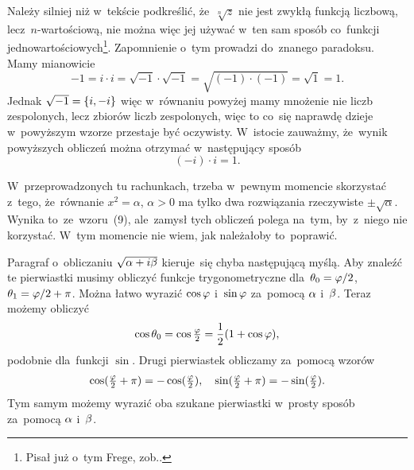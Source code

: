 \documentclass[a4paper,11pt]{article}
\begin{document}
\start {} Należy silniej niż w~tekście podkreślić,
że~$\sqrt[n]{ z }$ nie jest zwykłą funkcją liczbową,
lecz~$n$-wartościową, nie można więc jej używać w~ten sam sposób
co~funkcji jednowartościowych\footnote{Pisał już o~tym Frege,
  zob..}. Zapomnienie o~tym prowadzi do~znanego
paradoksu. Mamy mianowicie
\begin{equation}
  \label{eq:Leja-07}
  -1 = i \cdot i = \sqrt{ -1 } \cdot \sqrt{ -1 } 
  = \sqrt{ ( -1 ) \cdot ( -1 ) } = \sqrt{ 1 } = 1.
\end{equation}
Jednak $\sqrt{ -1 } = \{  i, -i  \}$ więc w~równaniu powyżej mamy
mnożenie nie liczb zespolonych, lecz zbiorów liczb zespolonych, więc
to co~się naprawdę dzieje w~powyższym wzorze przestaje być oczywisty.
W~istocie zauważmy, że~wynik powyższych obliczeń można otrzymać
w~następujący sposób
\begin{equation}
  \label{eq:Leja-08}
  ( -i ) \cdot i = 1.
\end{equation}

\vspace{\spaceFour}


\start {} W~przeprowadzonych tu rachunkach, trzeba w~pewnym
momencie skorzystać z~tego, że~równanie $x^{ 2 } = \alpha$,
$\alpha > 0$ ma tylko dwa rozwiązania rzeczywiste
$\pm \sqrt{ \alpha }$. Wynika to~ze~wzoru~(9), ale~zamysł tych
obliczeń polega na~tym, by~z~niego nie korzystać. W~tym momencie nie
wiem, jak należałoby to~poprawić.

\vspace{\spaceFour}


\start {} Paragraf o~obliczaniu $\sqrt{ \alpha + i \beta }$
kieruje~się chyba następującą myślą. Aby znaleźć te pierwiastki musimy
obliczyć funkcje trygonometryczne dla~$\theta_{ 0 } = \varphi / 2$,
$\theta_{ 1 } = \varphi / 2 + \pi$. Można łatwo wyrazić $\cos \varphi$
i~$\sin \varphi$ za~pomocą $\alpha$ i~$\beta$. Teraz możemy obliczyć
\begin{equation}
  \label{eq:Leja-09}
  \begin{split}
    \cos \theta_{ 0 } = \cos \tfrac{ \varphi }{ 2 } = \frac{ 1 }{ 2 } ( 1 + \cos
    \varphi ),
  \end{split}
\end{equation}
podobnie dla~funkcji $\sin$. Drugi pierwiastek obliczamy za~pomocą
wzorów
\begin{equation}
  \label{eq:Leja-10}
  \begin{split}
    \cos( \tfrac{ \varphi }{ 2 } + \pi ) = -\cos( \tfrac{ \varphi }{ 2 } ), \quad
    \sin( \tfrac{ \varphi }{ 2 } + \pi ) = -\sin( \tfrac{ \varphi }{ 2 } ).
  \end{split}
\end{equation}
Tym samym możemy wyrazić oba szukane pierwiastki w~prosty sposób
za~pomocą $\alpha$ i~$\beta$.
\end{document}
